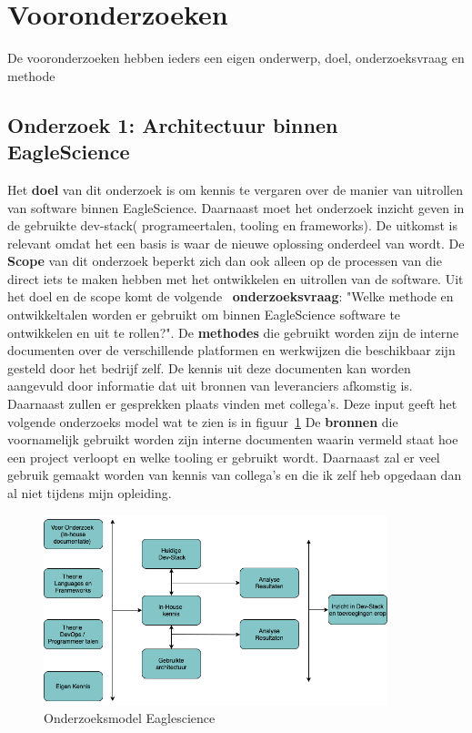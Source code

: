 \section{Vooronderzoeken}\label{sec:vooronderzoeken}
De vooronderzoeken hebben ieders een eigen onderwerp, doel, onderzoeksvraag en methode
\subsection{Onderzoek 1: Architectuur binnen EagleScience}\label{subsec:onderzoeksmethode-architectuur-binnen-eaglescience}
Het \textbf{doel} van dit onderzoek is om kennis te vergaren over de manier van uitrollen van software binnen EagleScience. Daarnaast moet het onderzoek inzicht geven in de gebruikte dev-stack( programeertalen, tooling en frameworks). De uitkomst is relevant omdat het een basis is waar de nieuwe oplossing onderdeel van wordt. De \textbf{Scope} van dit onderzoek beperkt zich dan ook alleen op de processen van die direct iets te maken hebben met het ontwikkelen en uitrollen van de software. Uit het doel en de scope komt de volgende ~\textbf{onderzoeksvraag}: "Welke methode en ontwikkeltalen worden er gebruikt om binnen EagleScience software te ontwikkelen en uit te rollen?". De \textbf{methodes} die gebruikt worden zijn de interne documenten over de verschillende platformen en werkwijzen die beschikbaar zijn gesteld door het bedrijf zelf. De kennis uit deze documenten kan worden aangevuld door informatie dat uit bronnen van leveranciers afkomstig is. Daarnaast zullen er gesprekken plaats vinden met collega's. Deze input geeft het volgende onderzoeks model wat te zien is in figuur~\ref{fig:OnderzoeksModelEaglescience}
De \textbf{bronnen} die voornamelijk gebruikt worden zijn interne documenten waarin vermeld staat hoe een project verloopt en welke tooling er gebruikt wordt. Daarnaast zal er veel gebruik gemaakt worden van kennis van collega's en die ik zelf heb opgedaan dan al niet tijdens mijn opleiding.
\begin{figure}[htbp]
    \myfloatalign
    \includegraphics[width=10cm]{gfx/OnderzoeksmodelES}
    \caption{Onderzoeksmodel Eaglescience}
    \label{fig:OnderzoeksModelEaglescience}
\end{figure}


